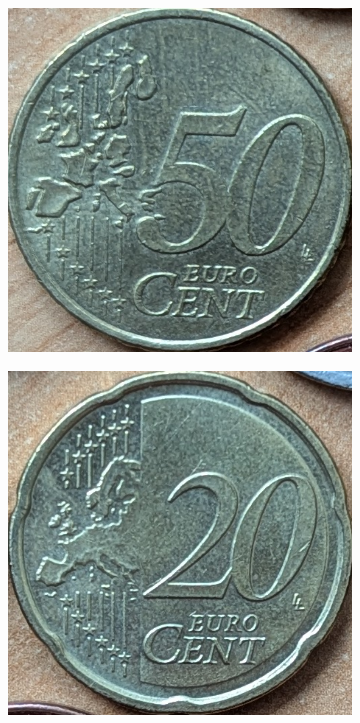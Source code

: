 \begin{figure}[ht]
\begin{subfigure}{0.23\textwidth}
    \end{subfigure}
    \begin{subfigure}{0.23\textwidth}
        \includegraphics[width=\linewidth]{../CoinFinder/templates_2/Cent50.png}
    \end{subfigure}
    \begin{subfigure}{0.23\textwidth}
        \includegraphics[width=\linewidth]{../CoinFinder/templates_2/Cent20.png}
    \end{subfigure}


\end{figure}
